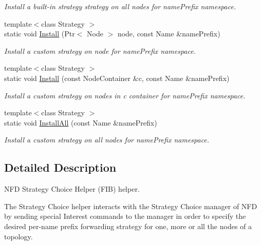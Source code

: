 \begin{DoxyCompactItemize}
\begin{DoxyCompactList}\small\item\em Install a built-\/in strategy {\ttfamily strategy} on all nodes for {\ttfamily name\+Prefix} namespace. \end{DoxyCompactList}\item 
{\footnotesize template$<$class Strategy $>$ }\\static void \hyperlink{classns3_1_1ndn_1_1StrategyChoiceHelper_a1c2aefe5164f9236ed5aae108af955fb}{Install} (Ptr$<$ Node $>$ node, const Name \&name\+Prefix)
\begin{DoxyCompactList}\small\item\em Install a custom strategy on {\ttfamily node} for {\ttfamily name\+Prefix} namespace. \end{DoxyCompactList}\item 
{\footnotesize template$<$class Strategy $>$ }\\static void \hyperlink{classns3_1_1ndn_1_1StrategyChoiceHelper_a528fac1abeff8de3534d5fe647a7bd62}{Install} (const Node\+Container \&c, const Name \&name\+Prefix)
\begin{DoxyCompactList}\small\item\em Install a custom strategy on nodes in {\ttfamily c} container for {\ttfamily name\+Prefix} namespace. \end{DoxyCompactList}\item 
{\footnotesize template$<$class Strategy $>$ }\\static void \hyperlink{classns3_1_1ndn_1_1StrategyChoiceHelper_aa76d7d0e8e5690c1b62b7eff427cda54}{Install\+All} (const Name \&name\+Prefix)
\begin{DoxyCompactList}\small\item\em Install a custom strategy on all nodes for {\ttfamily name\+Prefix} namespace. \end{DoxyCompactList}\end{DoxyCompactItemize}


\subsection{Detailed Description}
N\+FD Strategy Choice Helper (F\+IB) helper. 

The Strategy Choice helper interacts with the Strategy Choice manager of N\+FD by sending special Interest commands to the manager in order to specify the desired per-\/name prefix forwarding strategy for one, more or all the nodes of a topology. 

